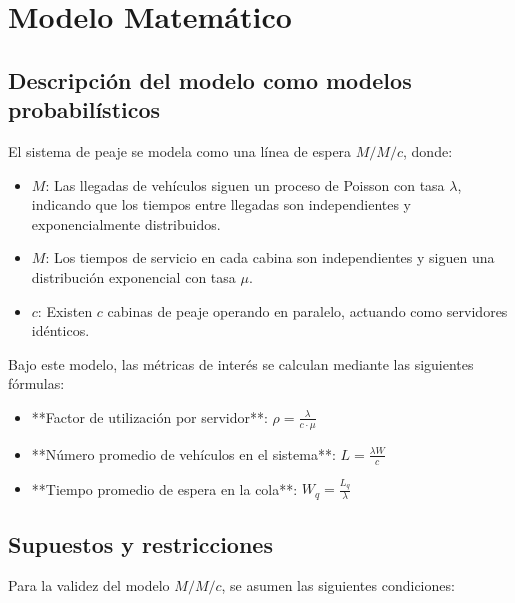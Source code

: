\documentclass[12pt]{article}
\begin{document}
    \section{Modelo Matemático}

    \subsection{Descripción del modelo como modelos probabilísticos}
    
    El sistema de peaje se modela como una línea de espera \( M/M/c \), donde:
    
    \begin{itemize}
        \item \( M \): Las llegadas de vehículos siguen un proceso de Poisson con tasa \( \lambda \), indicando que los tiempos entre llegadas son independientes y exponencialmente distribuidos.
        \item \( M \): Los tiempos de servicio en cada cabina son independientes y siguen una distribución exponencial con tasa \( \mu \).
        \item \( c \): Existen \( c \) cabinas de peaje operando en paralelo, actuando como servidores idénticos.
    \end{itemize}
    
    Bajo este modelo, las métricas de interés se calculan mediante las siguientes fórmulas:
    
    \begin{itemize}
        \item **Factor de utilización por servidor**: \( \rho = \frac{\lambda}{c \cdot \mu} \)
        \item **Número promedio de vehículos en el sistema**: \( L = \frac{\lambda W}{c} \)
        \item **Tiempo promedio de espera en la cola**: \( W_q = \frac{L_q}{\lambda} \)
    \end{itemize}
    
    \subsection{Supuestos y restricciones}
    
    Para la validez del modelo \( M/M/c \), se asumen las siguientes condiciones:
    
\end{document}
